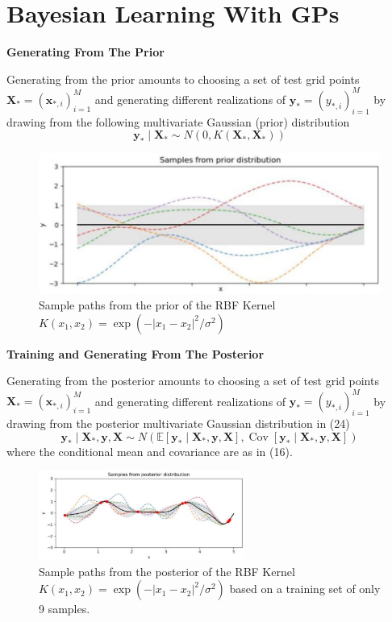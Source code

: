 \documentclass[11pt]{article}
\theoremstyle{plain} %
\theoremstyle{remark}
\begin{document}
\section{Bayesian Learning With GPs}
\textbf{Generating From The Prior}

Generating from the prior amounts to choosing a set of test grid points
$\mathbf{X}_{*}=\left(\mathbf{x}_{*, i}\right)_{i=1}^{M}$ and generating
different realizations of $\mathbf{y}_{*}=\left(y_{*, i}\right)_{i=1}^{M}$ by
drawing from the following multivariate Gaussian (prior) distribution 
$$
  \mathbf{y}_{*} \mid \mathbf{X}_{*} \sim N\left(0, K\left(\mathbf{X}_{*}, \mathbf{X}_{*}\right)\right)
$$

\begin{figure}[!htp]
  \centering
  \includegraphics[width=.6\textwidth]{images/2023_11_26_5b299dbd302e8f129737g-23}
      \caption{Sample paths from the prior of the RBF Kernel $K\left(x_{1},
      x_{2}\right)=\exp \left(-\left|x_{1}-x_{2}\right|^{2} /
      \sigma^{2}\right)$}
      \label{fig:RBF Kernel prior}
\end{figure}

\textbf{Training and Generating From The Posterior}

Generating from the posterior amounts to choosing a set of test grid points
$\mathbf{X}_{*}=\left(\mathbf{x}_{*, i}\right)_{i=1}^{M}$ and generating
different realizations of $\mathbf{y}_{*}=\left(y_{*, i}\right)_{i=1}^{M}$ by
drawing from the posterior multivariate Gaussian distribution in (24)
$$
  \mathbf{y}_{*} \mid \mathbf{X}_{*}, \mathbf{y}, \mathbf{X} \sim N\left(\mathbb{E}\left[\mathbf{y}_{*} \mid \mathbf{X}_{*}, \mathbf{y}, \mathbf{X}\right], \operatorname{Cov}\left[\mathbf{y}_{*} \mid \mathbf{X}_{*}, \mathbf{y}, \mathbf{X}\right]\right)
$$
where the conditional mean and covariance are as in (16).

\begin{figure}[!htp]
  \centering
  \includegraphics[width=0.6\textwidth]{images/2023_11_26_5b299dbd302e8f129737g-25}
  \caption{Sample paths from the posterior of the RBF Kernel $K\left(x_{1}, x_{2}\right)=\exp \left(-\left|x_{1}-x_{2}\right|^{2} /
  \sigma^{2}\right)$ based on a training set of only 9 samples.}
  \label{fig:RBF Kernel posterior}
\end{figure}
\end{document}
